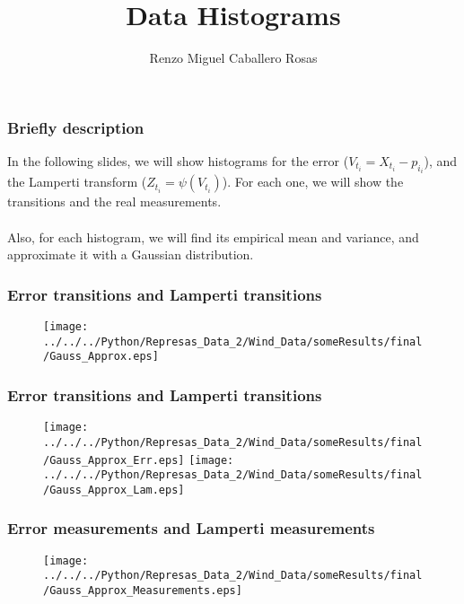 \documentclass[aspectratio=169]{beamer}\usepackage[utf8]{inputenc}
\title{Data Histograms}
\subtitle{Renzo Miguel Caballero Rosas}
\begin{document}
\begin{frame}
\titlepage
\end{frame}


\begin{frame}\frametitle{Briefly description}

In the following slides, we will show histograms for the error ($V_{t_i}=X_{t_i}-p_{i_i}$), and the Lamperti transform ($Z_{t_i}=\psi(V_{t_i})$). For each one, we will show the transitions and the real measurements.\\
\quad\\
Also, for each histogram, we will find its empirical mean and variance, and approximate it with a Gaussian distribution.

\end{frame}


\begin{frame}\frametitle{Error transitions and Lamperti transitions}

\begin{figure}[ht!]
\centering
\texttt{[image: ../../../Python/Represas\_Data\_2/Wind\_Data/someResults/final/Gauss\_Approx.eps]}
\end{figure}

\end{frame}


\begin{frame}\frametitle{Error transitions and Lamperti transitions}

\begin{figure}[ht!]
\centering
\texttt{[image: ../../../Python/Represas\_Data\_2/Wind\_Data/someResults/final/Gauss\_Approx\_Err.eps]}\quad
\texttt{[image: ../../../Python/Represas\_Data\_2/Wind\_Data/someResults/final/Gauss\_Approx\_Lam.eps]}
\end{figure}

\end{frame}



\begin{frame}\frametitle{Error measurements and Lamperti measurements}

\begin{figure}[ht!]
\centering
\texttt{[image: ../../../Python/Represas\_Data\_2/Wind\_Data/someResults/final/Gauss\_Approx\_Measurements.eps]}
\end{figure}

\end{frame}
\end{document}
